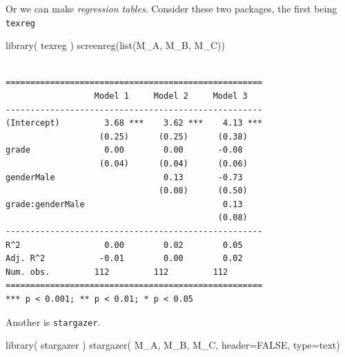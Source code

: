 \documentclass[
  letterpaper,
  DIV=11,
  numbers=noendperiod]{scrreprt}
\newenvironment{Shaded}{\begin{snugshade}}{\end{snugshade}}
\newcommand{\AttributeTok}[1]{\textcolor[rgb]{0.49,0.56,0.16}{#1}}
\newcommand{\ConstantTok}[1]{\textcolor[rgb]{0.53,0.00,0.00}{#1}}
\newcommand{\FunctionTok}[1]{\textcolor[rgb]{0.02,0.16,0.49}{#1}}
\newcommand{\NormalTok}[1]{\textcolor[rgb]{0.00,0.44,0.13}{#1}}
\newcommand{\StringTok}[1]{\textcolor[rgb]{0.25,0.44,0.63}{#1}}
\begin{document}
Or we can make \emph{regression tables}. Consider these two packages,
the first being \texttt{texreg}

\begin{Shaded}
\begin{Highlighting}[]
\FunctionTok{library}\NormalTok{( texreg )}
\FunctionTok{screenreg}\NormalTok{(}\FunctionTok{list}\NormalTok{(M\_A, M\_B, M\_C))}
\end{Highlighting}
\end{Shaded}

\begin{verbatim}

====================================================
                  Model 1     Model 2     Model 3   
----------------------------------------------------
(Intercept)         3.68 ***    3.62 ***    4.13 ***
                   (0.25)      (0.25)      (0.38)   
grade               0.00        0.00       -0.08    
                   (0.04)      (0.04)      (0.06)   
genderMale                      0.13       -0.73    
                               (0.08)      (0.50)   
grade:genderMale                            0.13    
                                           (0.08)   
----------------------------------------------------
R^2                 0.00        0.02        0.05    
Adj. R^2           -0.01        0.00        0.02    
Num. obs.         112         112         112       
====================================================
*** p < 0.001; ** p < 0.01; * p < 0.05
\end{verbatim}

Another is \texttt{stargazer}.

\begin{Shaded}
\begin{Highlighting}[]
\FunctionTok{library}\NormalTok{( stargazer )}
\FunctionTok{stargazer}\NormalTok{( M\_A, M\_B, M\_C, }\AttributeTok{header=}\ConstantTok{FALSE}\NormalTok{, }\AttributeTok{type=}\StringTok{\textquotesingle{}text\textquotesingle{}}\NormalTok{)}
\end{Highlighting}
\end{Shaded}
\end{document}
